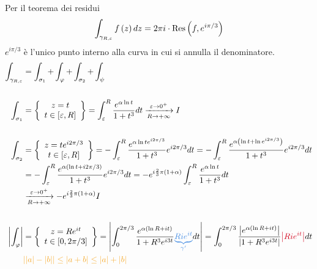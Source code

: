 Per il teorema dei residui
\begin{equation*}
\int _{\gamma _{R,\varepsilon }} f\left(z\right) dz = 2\pi i\cdot \operatorname{Res} \left(f,e^{i\pi /3}\right)
\end{equation*}
$e^{i\pi /3}$ è l'unico punto interno alla curva in cui si annulla il denominatore.
\begin{equation*}
\begin{aligned}
\int _{\gamma _{R,\varepsilon }} & = \int _{\sigma _{1}} + \int _{\varphi } + \int _{\sigma _{2}} + \int _{\psi }\\
 & \\
\int _{\sigma _{1}} & = \left\{\begin{array}{ c }
z = t\\
t\in [ \varepsilon ,R]
\end{array}\right\} = \int ^{R}_{\varepsilon }\frac{e^{\alpha \ln t}}{1 + t^{3}} dt\xrightarrow[R\rightarrow + \infty ]{\varepsilon \rightarrow 0^{ + }} I\\
 & \\
\int _{\sigma _{2}} & = \left\{\begin{array}{ c }
z = te^{i2\pi /3}\\
t\in [ \varepsilon ,R]
\end{array}\right\} = - \int ^{R}_{\varepsilon }\frac{e^{\alpha \ln te^{i2\pi /3}}}{1 + t^{3}} e^{i2\pi /3} dt = -\int ^{R}_{\varepsilon }\frac{e^{\alpha \left(\ln t + \ln e^{i2\pi /3}\right)}}{1 + t^{3}} e^{i2\pi /3} dt\\
 & = - \int ^{R}_{\varepsilon }\frac{e^{\alpha (\ln t + i2\pi /3)}}{1 + t^{3}} e^{i2\pi /3} dt = -e^{i\frac{2}{3} \pi (1 + \alpha)}\int ^{R}_{\varepsilon }\frac{e^{\alpha \ln t}}{1 + t^{3}} dt\\
 & \xrightarrow[R\rightarrow + \infty ]{\varepsilon \rightarrow 0^{ + }} - e^{i\frac{2}{3} \pi (1 + \alpha)} I\\
 & \\
\left| \int _{\varphi }\right|  & = \left\{\begin{array}{ c }
z = Re^{it}\\
t\in [ 0,2\pi /3]
\end{array}\right\} = \left| \int ^{2\pi /3}_{0}\frac{e^{\alpha (\ln R + it)}}{1 + R^{3} e^{i3t}}\textcolor[rgb]{0.29,0.56,0.89}{\underbrace{Rie^{it}}_{\gamma '}} dt\right| = \int ^{2\pi /3}_{0}\frac{\left| e^{\alpha (\ln R + it)}\right| }{\left| 1 + R^{3} e^{i3t}\right| }\textcolor[rgb]{0.82,0.01,0.11}{\left| Rie^{it}\right| } dt\\
 & \textcolor[rgb]{0.96,0.65,0.14}{| | a| - | b| | \leq | a + b| \leq | a| + | b| }\\

\end{aligned}
\end{equation*}
